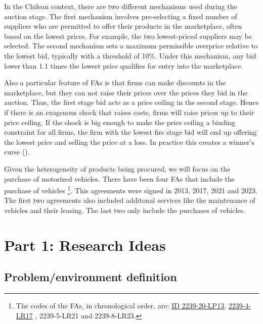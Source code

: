 \documentclass[12pt]{article}
\theoremstyle{plain}
\theoremstyle{plain}
\begin{document}
In the Chilean context, there are two different mechanisms used during the auction stage. The first mechanism involves pre-selecting a fixed number of suppliers who are permitted to offer their products in the marketplace, often based on the lowest prices. For example, the two lowest-priced suppliers may be selected. The second mechanism sets a maximum permissible overprice relative to the lowest bid, typically with a threshold of 10\%. Under this mechanism, any bid lower than 1.1 times the lowest price qualifies for entry into the marketplace.

 
Also a particular feature of FAs is that firms can make discounts in the marketplace, but they can not raise their prices over the prices they bid in the auction. Thus, the first stage bid acts as a price ceiling in the second stage.  Hence if there is an exogenous shock that raises costs, firms will raise prices up to their price ceiling. If the shock is big enough to make the price ceiling a binding constraint for all firms, the firm with the lowest firs stage bid will end up offering the lowest price and selling the price at a loss. In practice this creates a winner's curse (\cite{gur_framework_2017}). 


Given the heterogeneity of products being procured, we will focus on the purchase of motorized vehicles. There have been four FAs that include the purchase of vehicles \footnote{The codes of the FAs, in chronological order, are: 
\href{ https://www.chilecompra.cl/2014/09/licitacion-de-cinco-convenios-marco-buscan-amplia-participacion-de-empresarios-de-diferentes-rubros/}{ID 2239-20-LP13}, \href{https://www.chilecompra.cl/2017/05/nueva-licitacion-de-convenio-marco-para-la-adquisicion-y-arriendo-a-largo-plazo-de-vehiculos-motorizados-incorpora-opciones-para-hacer-mas-eficiente-la-adquisicion-y-uso-de-los-vehiculos/
}{2239-4-LR17}   , 2239-5-LR21 and 2239-8-LR23.}. This agreements were signed in  2013, 2017, 2021 and 2023. The first two agreements also included  additonal services like the maintenance of vehicles and their leasing. The last two only include the purchases of vehicles.


\section{ Part 1: Research Ideas} 


\subsection{Problem/environment definition }
\end{document}
